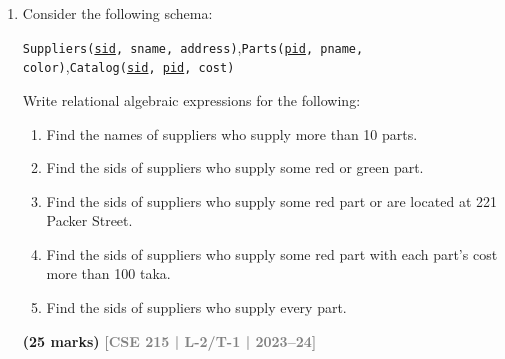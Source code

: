 \documentclass[12pt]{article}
\newcommand{\yr}[1]{\hfill\textcolor{gray}{\small\textbf{[#1]}}}
\newcommand{\mk}[1]{\textcolor{orange!70!black}{\small\textbf{(#1 marks)}}}
\begin{document}
\begin{enumerate}
\item Consider the following schema:
\begin{center}
\texttt{Suppliers(\underline{sid}, sname, address)},\quad \texttt{Parts(\underline{pid}, pname, color)},\quad \texttt{Catalog(\underline{sid}, \underline{pid}, cost)}
\end{center}
Write relational algebraic expressions for the following:
\begin{enumerate}
  \item Find the names of suppliers who supply more than 10 parts.
  \item Find the sids of suppliers who supply some red or green part.
  \item Find the sids of suppliers who supply some red part or are located at 221 Packer Street.
  \item Find the sids of suppliers who supply some red part with each part's cost more than 100 taka.
  \item Find the sids of suppliers who supply every part.
\end{enumerate}
\mk{25} \yr{CSE 215 | L-2/T-1 | 2023--24}



\end{enumerate}
\end{document}
